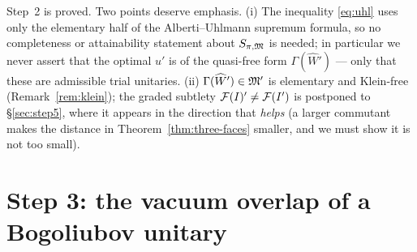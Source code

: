 \documentclass[11pt]{article}
\newcommand{\Gm}{\Gamma}
\begin{document}
\begin{verdictok}
Step~2 is proved.  Two points deserve emphasis.  (i) The inequality \eqref{eq:uhl} uses only the
elementary half of the Alberti--Uhlmann supremum formula, so no completeness or attainability
statement about $S_{\pi,\mathfrak M}$ is needed; in particular we never assert that the optimal $u'$ is of
the quasi-free form $\Gm(\widehat W')$ --- only that these are admissible trial unitaries.
(ii) $\Gm(\widehat W')\in\cM'$ is elementary and Klein-free (Remark~\ref{rem:klein}); the graded
subtlety $\mathcal F(I)'\ne\mathcal F(I')$ is postponed to \S\ref{sec:step5}, where it appears in the direction
that \emph{helps} (a larger commutant makes the distance in Theorem~\ref{thm:three-faces} smaller,
and we must show it is not too small).
\end{verdictok}

\section{Step 3: the vacuum overlap of a Bogoliubov unitary}\label{sec:step3}
\end{document}
